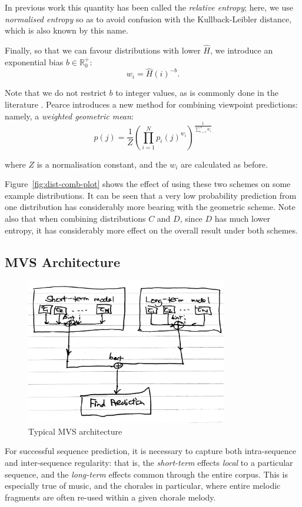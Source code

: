 \documentclass[12pt,a4paper,twoside,openright]{report}
\begin{document}
In previous work this quantity has been called the \emph{relative entropy};
here, we use \emph{normalised entropy} so as to avoid confusion with the
Kullback-Leibler distance, which is also known by this name.

Finally, so that we can favour distributions with lower $\hat{H}$, we introduce
an exponential bias $b \in \mathbb{R}_0^+$:
$$ w_i = \hat{H}(i)^{-b}. $$

Note that we do not restrict $b$ to integer values, as is commonly done in the
literature \cite{whorley2013phd}. Pearce \cite{pearce2004improved} introduces a
new method for combining viewpoint predictions: namely, a \emph{weighted
geometric mean}:
$$ p(j) = \frac{1}{Z} \left( \prod_{i = 1}^N p_i(j)^{w_i} \right)^{ \frac{1}{
\sum_{i = 1}^N w_i }} $$

where $Z$ is a normalisation constant, and the $w_i$ are calculated as before.

Figure~\ref{fig:dist-comb-plot} shows the effect of using these two schemes on
some example distributions. It can be seen that a very low probability
prediction from one distribution has considerably more bearing with the
geometric scheme. Note also that when combining distributions $C$ and $D$, since
$D$ has much lower entropy, it has considerably more effect on the overall
result under both schemes.

\subsection{MVS Architecture}

\begin{figure}[H]
\centering
\includegraphics[width=250pt]{figs/mvs_arch_tmp.jpg}
\caption{Typical MVS architecture}
\label{fig:mvs-arch}
\end{figure}

For successful sequence prediction, it is necessary to capture both
intra-sequence and inter-sequence regularity: that is, the \emph{short-term}
effects \emph{local} to a particular sequence, and the \emph{long-term} effects
common through the entire corpus.  This is especially true of music, and the
chorales in particular, where entire melodic fragments are often re-used within
a given chorale melody.
\end{document}
